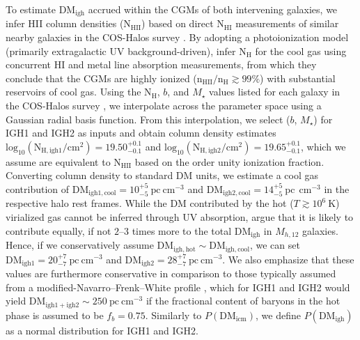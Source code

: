 \documentclass[twocolumn, linenumbers, tra]{aastex631}
\newcommand{\rev}[1]{{\color{purple}#1}}
\begin{document}
To estimate DM$_{\mathrm{igh}}$ accrued within the CGMs of both intervening galaxies, we infer HII column densities (N$_{\mathrm{HII}}$) based on direct N$_{\mathrm{HI}}$ measurements of similar nearby galaxies in the COS-Halos survey \cite[a study of 44 galaxy halos at $z \sim 0.2$ with cool $T \sim 10^{4}\ \mathrm{K}$ photoionized CGMs observed out to radii of $ \sim 160\ \mathrm{kpc}$;][]{Werk2014}. By adopting a photoionization model (primarily extragalactic UV background-driven), \citet{Werk2014} infer $\mathrm{N}_{\mathrm{H}}$ for the cool gas using concurrent HI and metal line absorption measurements, from which they conclude that the CGMs are highly ionized ($\mathrm{n}_{\mathrm{HII}} / \mathrm{n}_{\mathrm{H}} \gtrsim 99 \%$) with substantial reservoirs of cool gas. Using the N$_{\mathrm{H}}$, $b$, and $M_\star$ values listed for each galaxy in the COS-Halos survey \citep[see their Table 1;][]{Werk2014}, we interpolate across the parameter space using a Gaussian radial basis function. From this interpolation, we select ($b$, $M_\star$) for IGH1 and IGH2 as inputs and obtain column density estimates $\mathrm{log}_{10}(\mathrm{N}_{\mathrm{H}, \mathrm{igh1}}/\mathrm{cm}^{2}) = 19.50^{+0.1}_{-0.1}$ and $\mathrm{log}_{10}(\mathrm{N}_{\mathrm{H}, \mathrm{igh2}}/\mathrm{cm}^{2}) = 19.65^{+0.1}_{-0.1}$, which we assume are equivalent to N$_{\mathrm{HII}}$ based on the order unity ionization fraction. Converting column density to standard DM units, we estimate a cool gas contribution of $\mathrm{DM}_{\mathrm{igh1,cool}} = 10^{+5}_{-5}\ \mathrm{pc} \mathrm{\ cm}^{-3}$ and $\mathrm{DM}_{\mathrm{igh2,cool}} = 14^{+5}_{-5}\ \mathrm{pc}\ \mathrm{\ cm}^{-3}$ in the respective halo rest frames. While the DM contributed by the hot ($T \gtrsim 10^6\ \mathrm{K}$) virialized gas cannot be inferred through UV absorption, \citet{Prochaska2019a} argue that it is likely to contribute equally, if not $2$--$3$ times more to the total $\mathrm{DM}_{\mathrm{igh}}$ in $M_{h,12}$ galaxies. \rev{Hence, if we conservatively assume $\mathrm{DM}_{\mathrm{igh,hot}} \sim \mathrm{DM}_{\mathrm{igh,cool}}$, we can set $\mathrm{DM}_{\mathrm{igh1}} = 20^{+7}_{-7}\ \mathrm{pc} \mathrm{\ cm}^{-3}$ and $\mathrm{DM}_{\mathrm{igh2}} = 28^{+7}_{-7}\ \mathrm{pc} \mathrm{\ cm}^{-3}$. We also emphasize that these values are furthermore conservative in comparison to those typically assumed from a modified-Navarro--Frenk--White profile \citep[see Eq.\,6 in][]{Prochaska2019a}, which for IGH1 and IGH2 would yield $\mathrm{DM}_{\mathrm{igh1+igh2}} \sim 250\ \mathrm{pc\ cm}^{-3}$ if the fractional content of baryons in the hot phase is assumed to be $f_b = 0.75$. Similarly to $P(\mathrm{DM}_{\mathrm{icm}})$, we define $P(\mathrm{DM}_{\mathrm{igh}})$ as a normal distribution for IGH1 and IGH2.}
\end{document}
